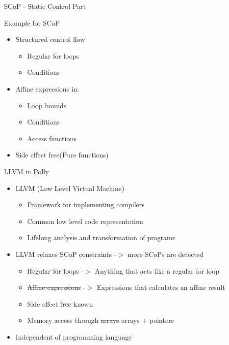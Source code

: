 \documentclass{beamer}
\begin{document}
\begin{frame}{SCoP - Static Control Part}
\begin{block}{Example for SCoP}
{}
\end{block}

\begin{itemize}
\item Structured control flow
	\begin{itemize}
	\item Regular for loops
	\item Conditions
	\end{itemize}
\item Affine expressions in:
	\begin{itemize}
	\item Loop bounds
	\item Conditions
	\item Access functions
	\end{itemize}
\item Side effect free(Pure functions)
\end{itemize}

\end{frame}

\begin{frame}{LLVM in Polly}
\begin{itemize}
\item LLVM (Low Level Virtual Machine)
	\begin{itemize}
	\item Framework for implementing compilers
	\item Common low level code representation
	\item Lifelong analysis and transformation of programs
	\end{itemize}
\item LLVM relaxes SCoP constraints -$>$ more SCoPs are detected
	\begin{itemize}
	\item \sout{Regular for loops} -$>$ Anything that acts like a regular for loop
	\item \sout{Affine expressions} -$>$ Expressions that calculates an affine result
	\item Side effect \sout{free} known
	\item Memory access through \sout{arrays} arrays + pointers
	\end{itemize}
\item Independent of programming language
\end{itemize}
\end{frame}
\end{document}

